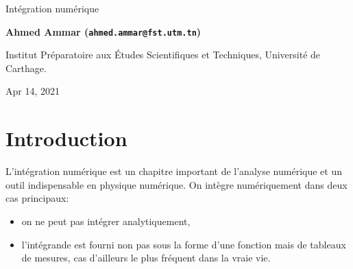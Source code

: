 \documentclass[%
oneside,                 %
final,                   %
10pt]{article}
\begin{document}

\newcommand{\exercisesection}[1]{\subsection*{#1}}






\thispagestyle{empty}

\begin{center}
{\LARGE\bf
\begin{spacing}{1.25}
Intégration numérique
\end{spacing}
}
\end{center}


\begin{center}
{\bf Ahmed Ammar (\texttt{ahmed.ammar@fst.utm.tn})}
\end{center}

    \begin{center}
\centerline{{\small Institut Préparatoire aux Études Scientifiques et Techniques, Université de Carthage.}}
\end{center}
    

\begin{center}
Apr 14, 2021
\end{center}

\vspace{1cm}


\tableofcontents


\vspace{1cm} %




\section{Introduction}
L'intégration numérique est un chapitre important de l'analyse numérique et un outil indispensable en physique numérique. On intègre numériquement dans deux cas principaux:

\begin{itemize}
\item on ne peut pas intégrer analytiquement,

\item l'intégrande est fourni non pas sous la forme d'une fonction mais de tableaux de mesures, cas d'ailleurs le plus fréquent dans la vraie vie.
\end{itemize}
\end{document}
